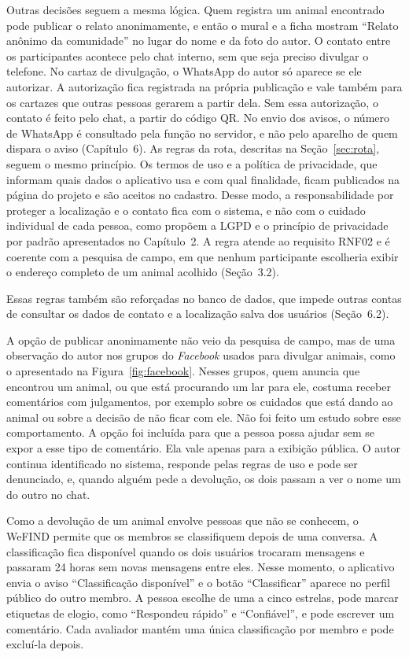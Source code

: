 Outras decisões seguem a mesma lógica. Quem registra um animal encontrado pode publicar o relato anonimamente, e então o mural e a ficha mostram ``Relato anônimo da comunidade'' no lugar do nome e da foto do autor. O contato entre os participantes acontece pelo chat interno, sem que seja preciso divulgar o telefone. No cartaz de divulgação, o WhatsApp do autor só aparece se ele autorizar. A autorização fica registrada na própria publicação e vale também para os cartazes que outras pessoas gerarem a partir dela. Sem essa autorização, o contato é feito pelo chat, a partir do código QR. No envio dos avisos, o número de WhatsApp é consultado pela função no servidor, e não pelo aparelho de quem dispara o aviso (Capítulo~6). As regras da rota, descritas na Seção~\ref{sec:rota}, seguem o mesmo princípio. Os termos de uso e a política de privacidade, que informam quais dados o aplicativo usa e com qual finalidade, ficam publicados na página do projeto e são aceitos no cadastro. Desse modo, a responsabilidade por proteger a localização e o contato fica com o sistema, e não com o cuidado individual de cada pessoa, como propõem a LGPD e o princípio de privacidade por padrão apresentados no Capítulo~2. A regra atende ao requisito RNF02 e é coerente com a pesquisa de campo, em que nenhum participante escolheria exibir o endereço completo de um animal acolhido (Seção~3.2).

Essas regras também são reforçadas no banco de dados, que impede outras contas de consultar os dados de contato e a localização salva dos usuários (Seção~6.2).

A opção de publicar anonimamente não veio da pesquisa de campo, mas de uma observação do autor nos grupos do \textit{Facebook} usados para divulgar animais, como o apresentado na Figura~\ref{fig:facebook}. Nesses grupos, quem anuncia que encontrou um animal, ou que está procurando um lar para ele, costuma receber comentários com julgamentos, por exemplo sobre os cuidados que está dando ao animal ou sobre a decisão de não ficar com ele. Não foi feito um estudo sobre esse comportamento. A opção foi incluída para que a pessoa possa ajudar sem se expor a esse tipo de comentário. Ela vale apenas para a exibição pública. O autor continua identificado no sistema, responde pelas regras de uso e pode ser denunciado, e, quando alguém pede a devolução, os dois passam a ver o nome um do outro no chat.

Como a devolução de um animal envolve pessoas que não se conhecem, o WeFIND permite que os membros se classifiquem depois de uma conversa. A classificação fica disponível quando os dois usuários trocaram mensagens e passaram 24 horas sem novas mensagens entre eles. Nesse momento, o aplicativo envia o aviso ``Classificação disponível'' e o botão ``Classificar'' aparece no perfil público do outro membro. A pessoa escolhe de uma a cinco estrelas, pode marcar etiquetas de elogio, como ``Respondeu rápido'' e ``Confiável'', e pode escrever um comentário. Cada avaliador mantém uma única classificação por membro e pode excluí-la depois.


